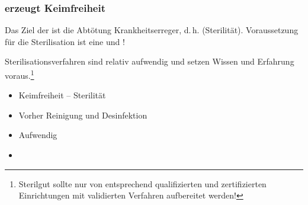 \subsubsection{ erzeugt Keimfreiheit}
\label{topic:sterilisation-grundzuege}
{%
Das Ziel der  ist die Abtötung
 Krankheitserreger, d.\,h. 
(Sterilität).
Voraussetzung für die Sterilisation ist eine  und !

 Sterilisationsverfahren sind relativ
aufwendig und setzen Wissen und Erfahrung
voraus.\footnote{Sterilgut sollte nur von entsprechend
qualifizierten und zertifizierten Einrichtungen mit
validierten Verfahren aufbereitet werden!}
}{
\begin{itemize}
  \item Keimfreiheit -- Sterilität
  \item Vorher Reinigung und Desinfektion
  \item Aufwendig
  \item {}
\end{itemize}
}{}{}{}



